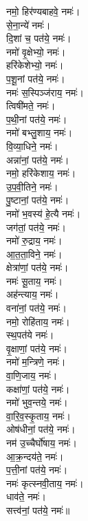 \begin{multicols}{2}
\setmainfont[Script=Devanagari]{Siddhanta}
\begin{flushleft}
नमो॒ हिर॑ण्यबाहवे॒ नमः॑।\\
से॒ना॒न्ये॑  नमः॑।\\
दि॒शां च॒ पत॑ये॒ नमः॑।\\
नमो॑ वृ॒क्षेभ्यो॒ नमः॑।\\
हरि॑केशेभ्यो॒  नमः॑।\\
प॒शू॒नां पत॑ये॒  नमः॑।\\
नमः॑ स॒स्पिञ्ज॑राय॒ नमः॑।\\
त्विषी॑मते॒ नमः॑।\\
प॒थी॒नां पत॑ये॒ नमः॑।\\
नमो॑ बभ्लु॒शाय॒ नमः॑।\hfill {}\\
वि॒व्या॒धिने॒ नमः॑।\\
अन्ना॑नां॒ पत॑ये॒ नमः॑।\\
नमो॒ हरि॑केशाय॒ नमः॑।\\
उ॒प॒वी॒तिने॒ नमः॑।\\
पु॒ष्टानां॒ पत॑ये॒ नमः॑।\\
नमो॑ भ॒वस्य॑ हे॒त्यै नमः॑।\\
जग॑तां॒ पत॑ये॒ नमः॑।\\
नमो॑ रु॒द्राय॒ नमः॑।\\
आ॒त॒ता॒विने॒ नमः॑।\\
क्षेत्रा॑णां॒ पत॑ये॒ नमः॑।\hfill {}\\
नमः॑ सू॒ताय॒ नमः॑।\\
अह॑न्त्याय॒ नमः॑।\\
वना॑नां॒  पत॑ये॒ नमः॑।\\
नमो॒ रोहि॑ताय॒ नमः॑।\\
स्थ॒पत॑ये नमः॑।\\
वृ॒क्षाणां॒ पत॑ये॒ नमः॑।\\
नमो॑ म॒न्त्रिणे॒ नमः॑।\\
वा॒णि॒जाय॒ नमः॑।\\
कक्षा॑णां॒ पत॑ये॒ नमः॑।\\
नमो॑ भुव॒न्तये॒ नमः॑।\hfill {}\\
वा॒रि॒व॒स्कृ॒ताय॒ नमः॑।\\
ओष॑धीनां॒ पत॑ये॒ नमः॑।\\
नम॑ उ॒च्चैर्घो॑षाय॒ नमः॑।\\
आ॒क्र॒न्दय॑ते॒ नमः॑।\\
प॒त्ती॒नां पत॑ये॒ नमः॑।\\
नमः॑ कृत्स्नवी॒ताय॒ नमः॑।\\
धाव॑ते॒ नमः॑।\\
सत्त्व॑नां॒ पत॑ये॒ नमः॑॥\\


\end{flushleft}
\end{multicols}
